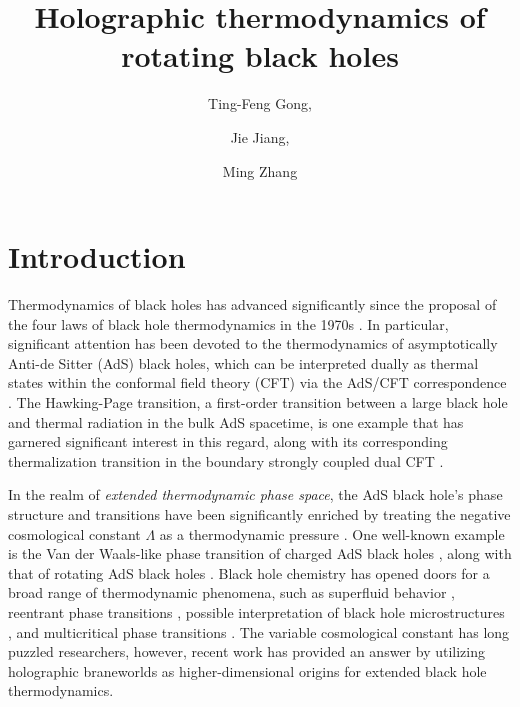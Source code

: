 \documentclass[a4paper,11pt]{article}
\title{Holographic thermodynamics of rotating black holes}
\author[a]{Ting-Feng Gong,}
\author[b]{Jie Jiang,}
\author[a,1]{Ming Zhang \note{Corresponding author}}
\affiliation[a]{Department of Physics, Jiangxi Normal University,\\ Nanchang 330022, China}
\affiliation[b]{College of Education for the Future, Beijing Normal University, \\ Zhuhai 519087, China}
\begin{document}
\maketitle
\flushbottom


\section{Introduction}

Thermodynamics of black holes has advanced significantly since the proposal of the four laws of black hole thermodynamics in the 1970s \cite{Bardeen:1973gs, Bekenstein:1973ur}. In particular, significant attention has been devoted to the thermodynamics of asymptotically Anti-de Sitter (AdS) black holes, which can be interpreted dually as thermal states within the conformal field theory (CFT) via the AdS/CFT correspondence \cite{Maldacena:1997re}. The Hawking-Page transition, a first-order transition between a large black hole and thermal radiation in the bulk AdS spacetime, is one example that has garnered significant interest in this regard, along with its corresponding thermalization transition in the boundary strongly coupled dual CFT \cite{Hawking:1982dh, Witten:1998zw}.



In the realm of {\it extended thermodynamic phase space}, the AdS black hole's phase structure and transitions have been significantly enriched by treating the negative cosmological constant $\Lambda$ as a thermodynamic pressure \cite{Kastor:2009wy,Dolan:2010ha,Dolan:2011xt,Cvetic:2010jb}. One well-known example is the Van der Waals-like phase transition of charged AdS black holes \cite{Chamblin:1999tk,Chamblin:1999hg,Cvetic:1999ne,Kubiznak:2012wp}, along with that of rotating AdS black holes \cite{Gunasekaran:2012dq,Wei:2015ana,Cheng:2016bpx}. Black hole chemistry \cite{Kubiznak:2016qmn} has opened doors for a broad range of thermodynamic phenomena, such as superfluid behavior \cite{Hennigar:2016xwd}, reentrant phase transitions \cite{Frassino:2014pha}, possible interpretation of black hole microstructures \cite{Wei:2019uqg}, and multicritical phase transitions \cite{Tavakoli:2022kmo,Wu:2022plw}. The variable cosmological constant has long puzzled researchers, however, recent work \cite{Frassino:2022zaz} has provided an answer by utilizing holographic braneworlds as higher-dimensional origins for extended black hole thermodynamics. 
\end{document}
